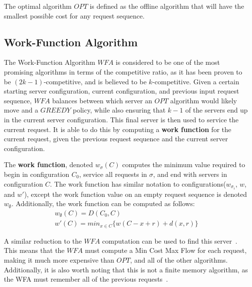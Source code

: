 \begin{definition}
    The optimal algorithm $OPT$ is defined as the offline algorithm that will have the smallest possible cost for any request sequence.
\end{definition}

\subsection{Work-Function Algorithm}
\label{sec:WFA}
The Work-Function Algorithm $WFA$ is considered to be one of the most promising algorithms in terms of the competitive ratio, as it has been proven to be $(2k-1)$-competitive, and is believed to be $k$-competitive. Given a certain starting server configuration, current configuration, and previous input request sequence, $WFA$ balances between which server an $OPT$ algorithm would likely move and a $GREEDY$ policy, while also ensuring that $k-1$ of the servers end up in the current server configuration. This final server is then used to service the current request. It is able to do this by computing a \textbf{work function} for the current request, given the previous request sequence and the current server configuration.

\begin{definition}
    The \textbf{work function}, denoted $w_\sigma(C)$ computes the minimum value required to begin in configuration $C_0$, service all requests in $\sigma$, and end with servers in configuration $C$. The work function has similar notation to configurations($w_{\sigma_i}$, $w$, and $w'$), except the work function value on an empty request sequence is denoted $w_\emptyset$. Additionally, the work function can be computed as follows:
    \begin{equation*}
        \begin{gathered}
            w_\emptyset(C) = D(C_0, C) \\
            w'(C) = min_{x \in C} \{ w(C - x + r) + d(x, r)\}
        \end{gathered}
    \end{equation*}
\end{definition}

A similar reduction to the $WFA$ computation can be used to find this server~\cite{WFA2009}. This means that the $WFA$ must compute a Min Cost Max Flow for each request, making it much more expensive than $OPT$, and all of the other algorithms. Additionally, it is also worth noting that this is not a finite memory algorithm, as the WFA must remember all of the previous requests~\cite{MAXMAX2005}. 

